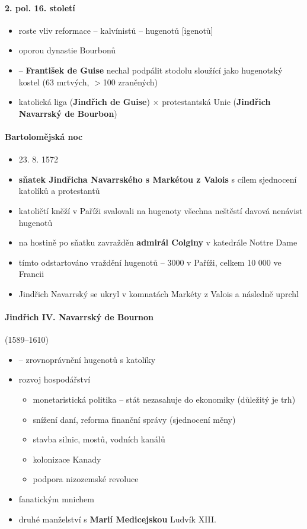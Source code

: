 \paragraph{2. pol. 16. století}
\begin{itemize}
\item roste vliv reformace -- kalvínistů -- hugenotů [igenotů]
\item oporou dynastie Bourbonů
\item {}  -- \textbf{František de Guise} nechal podpálit stodolu sloužící jako hugenotský kostel (63 mrtvých, $>$100 zraněných)
\item katolická liga (\textbf{Jindřich de Guise}) $\times$ protestantská Unie (\textbf{Jindřich Navarrský de Bourbon})
\end{itemize}

\paragraph{Bartolomějská noc}
\begin{itemize}
\item 23. 8. 1572
\item \textbf{sňatek Jindřicha Navarrského s Markétou z Valois} s cílem sjednocení katolíků a protestantů
\item katoličtí kněží v Paříži svalovali na hugenoty všechna neštěstí \ra davová nenávist hugenotů
\item na hostině po sňatku zavražděn \textbf{admirál Colginy} v katedrále Nottre Dame
\item tímto odstartováno vraždění hugenotů -- 3000 v Paříži, celkem 10 000 ve Francii
\item Jindřich Navarrský se ukryl v komnatách Markéty z Valois a následně uprchl

\end{itemize}

\paragraph{Jindřich IV. Navarrský de Bournon} (1589--1610)
\begin{itemize}
\item {} -- zrovnoprávnění hugenotů s katolíky
\item rozvoj hospodářství
	\begin{itemize}
	\item monetaristická politika -- stát nezasahuje do ekonomiky (důležitý je trh)
	\item snížení daní, reforma finanční správy (sjednocení měny)
	\item stavba silnic, mostů, vodních kanálů 
	\item kolonizace Kanady
	\item podpora nizozemské revoluce
	\end{itemize}
\item {} fanatickým mnichem
\item druhé manželství s \textbf{Marií Medicejskou} \ra Ludvík XIII.
\end{itemize}

